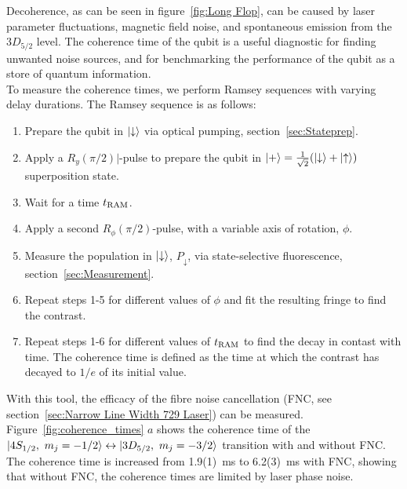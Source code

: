    Decoherence, as can be seen in figure~\ref{fig:Long Flop}, can be caused by laser parameter fluctuations, magnetic field noise, and spontaneous emission from the $3D_{5/2}$ level. The coherence time of the qubit is a useful diagnostic for finding unwanted noise sources, and for benchmarking the performance of the qubit as a store of quantum information.\\
    To measure the coherence times, we perform Ramsey sequences with varying delay durations. The Ramsey sequence is as follows:
    \begin{enumerate}
        \item Prepare the qubit in $\ket{\downarrow}$ via optical pumping, section~\ref{sec:Stateprep}.
        \item Apply a $R_y(\pi/2)|$-pulse to prepare the qubit in $\ket{+} = \frac{1}{\sqrt{2}}(\ket{\downarrow} + \ket{\uparrow})$ superposition state.
        \item Wait for a time $t_{\rm RAM}$.
        \item Apply a second $R_\phi(\pi/2)$-pulse, with a variable axis of rotation, $\phi$. 
        \item Measure the population in $\ket{\downarrow}$, $P_\downarrow$, via state-selective fluorescence, section~\ref{sec:Measurement}.
        \item Repeat steps 1-5 for different values of $\phi$ and fit the resulting fringe to find the contrast.
        \item Repeat steps 1-6 for different values of $t_{\rm RAM}$ to find the decay in contast with time. The coherence time is defined as the time at which the contrast has decayed to $1/e$ of its initial value.
    \end{enumerate}
    With this tool, the efficacy of the fibre noise cancellation (FNC, see section~\ref{sec:Narrow Line Width 729 Laser}) can be measured. Figure~\ref{fig:coherence_times} $a$ shows the coherence time of the $\ket{4S_{1/2},~m_j=-1/2}\leftrightarrow\ket{3D_{5/2},~m_j=-3/2}$  transition with and without FNC. The coherence time is increased from 1.9(1)~\unit{\ms} to 6.2(3)~\unit{\ms} with FNC, showing that without FNC, the coherence times are limited by laser phase noise. \\
